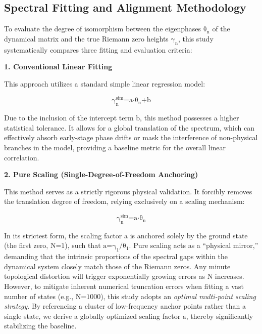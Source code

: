 \subsection*{Spectral Fitting and Alignment Methodology}

To evaluate the degree of isomorphism between the eigenphases
\(\text{θ}_{\text{n}}\) of the dynamical matrix and the true Riemann
zero heights \(\text{γ}_{\text{n}}\), this study systematically compares
three fitting and evaluation criteria:

\textbf{1. Conventional Linear Fitting}

This approach utilizes a standard simple linear regression model:

\[\text{γ}_{\text{n}}^{\text{sim}}\text{=}\text{a}\text{⋅}\text{θ}_{\text{n}}\text{+}\text{b}\]

Due to the inclusion of the intercept term \(\text{b}\), this method
possesses a higher statistical tolerance. It allows for a global
translation of the spectrum, which can effectively absorb early-stage
phase drifts or mask the interference of non-physical branches in the
model, providing a baseline metric for the overall linear correlation.

\textbf{2. Pure Scaling (Single-Degree-of-Freedom Anchoring)}

This method serves as a strictly rigorous physical validation. It
forcibly removes the translation degree of freedom, relying exclusively
on a scaling mechanism:

\[\text{γ}_{\text{n}}^{\text{sim}}\text{=}\text{a}\text{⋅}\text{θ}_{\text{n}}\]

In its strictest form, the scaling factor \(\text{a}\) is anchored
solely by the ground state (the first zero, \(\text{N}\text{=1}\)), such
that \(\text{a}\text{=}\text{γ}_{\text{1}}\text{/}\text{θ}_{\text{1}}\).
Pure scaling acts as a ``physical mirror,'' demanding that the intrinsic
proportions of the spectral gaps within the dynamical system closely
match those of the Riemann zeros. Any minute topological distortion will
trigger exponentially growing errors as \(\text{N}\) increases. However,
to mitigate inherent numerical truncation errors when fitting a vast
number of states (e.g., \(\text{N}\text{=1000}\)), this study adopts an
\emph{optimal multi-point scaling strategy}. By referencing a cluster of
low-frequency anchor points rather than a single state, we derive a
globally optimized scaling factor \(\text{a}\), thereby significantly
stabilizing the baseline.


